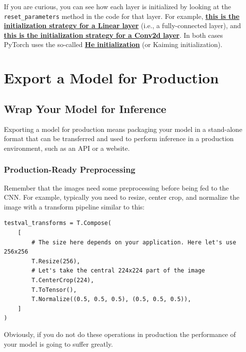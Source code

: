 If you are curious, you can see how each layer is initialized by looking at the \lstinline{reset_parameters} method in the code for that layer. For example, \href{https://github.com/pytorch/pytorch/blob/f9d07ae6449224bdcb6eb69044a33f0fb5780adf/torch/nn/modules/linear.py\#L92}{\textbf{this is the initialization strategy for a Linear layer}} (i.e., a fully-connected layer), and \href{https://github.com/pytorch/pytorch/blob/f9d07ae6449224bdcb6eb69044a33f0fb5780adf/torch/nn/modules/conv.py\#L140}{\textbf{this is the initialization strategy for a Conv2d layer}}. In both cases PyTorch uses the so-called \href{https://paperswithcode.com/method/he-initialization}{\textbf{He initialization}} (or Kaiming initialization).

\section{Export a Model for Production}

\subsection{Wrap Your Model for Inference}

Exporting a model for production means packaging your model in a stand-alone format that can be transferred and used to perform inference in a production environment, such as an API or a website.

\subsubsection{Production-Ready Preprocessing}

Remember that the images need some preprocessing before being fed to the CNN. For example, typically you need to resize, center crop, and normalize the image with a transform pipeline similar to this:
\begin{lstlisting}
testval_transforms = T.Compose(
    [
        # The size here depends on your application. Here let's use 256x256
        T.Resize(256),
        # Let's take the central 224x224 part of the image
        T.CenterCrop(224),
        T.ToTensor(),
        T.Normalize((0.5, 0.5, 0.5), (0.5, 0.5, 0.5)),
    ]
)
\end{lstlisting}

Obviously, if you do not do these operations in production the performance of your model is going to suffer greatly. \newline

